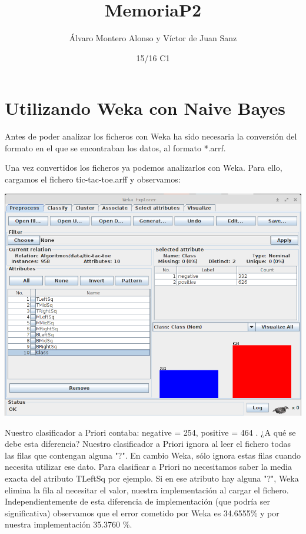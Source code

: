 \documentclass[nochap]{apuntes}
\title{MemoriaP2}
\author{Álvaro Montero Alonso y Víctor de Juan Sanz}
\date{15/16 C1}
\begin{document}
\pagestyle{plain}
\maketitle

\tableofcontents
\newpage
\section{Utilizando Weka con Naive Bayes}

Antes de poder analizar los ficheros con Weka ha sido necesaria la conversión del formato en el que se encontraban los datos, al formato *.arrf. 

Una vez convertidos los ficheros ya podemos analizarlos con Weka. Para ello, cargamos el fichero tic-tac-toe.arff y observamos:


\begin{center}
\includegraphics[scale=0.5]{img/Tic-tac-toe_APriori.png}
\end{center}

Nuestro clasificador a Priori contaba: { negative = 254, positive = 464} . ¿A qué se debe esta diferencia? Nuestro clasificador a Priori ignora al leer el fichero todas las filas que contengan alguna "?". En cambio Weka, sólo ignora estas filas cuando necesita utilizar ese dato. Para clasificar a Priori no necesitamos saber la media exacta del atributo TLeftSq por ejemplo. Si en ese atributo hay alguna "?", Weka elimina la fila al necesitar el valor, nuestra implementación al cargar el fichero.
Independientemente de esta diferencia de implementación (que podría ser significativa) observamos que el error cometido por Weka es 34.6555\% y por nuestra implementación 35.3760 \%. 
\end{document}
